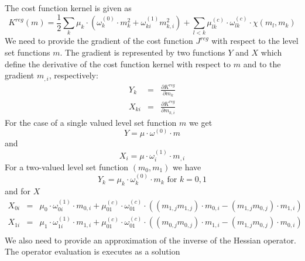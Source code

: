 The cost function kernel is given as
\begin{equation}\label{ref:EQU:REG:100}
K^{reg}(m) = \frac{1}{2}
\sum_{k} \mu_k \cdot ( \omega^{(0)}_k \cdot m_k^2 + \omega^{(1)}_{ki}m_{k,i}^2 ) 
+  \sum_{l<k} \mu^{(c)}_{lk} \cdot \omega^{(c)}_{lk}  \cdot  \chi(m_l,m_k)
\end{equation} 
We need to provide the gradient of the cost function $J^{reg}$  with respect to the level set functions $m$.
The gradient is represented by two functions $Y$ and $X$ which define the 
derivative of the cost function kernel with respect to $m$ and to the gradient $m_{,i}$, respectively:
\begin{equation}\label{ref:EQU:REG:101}
\begin{array}{rcl}
  Y_k & = & \displaystyle{\frac{\partial K^{reg}}{\partial m_k}} \\
   X_{ki} & = & \displaystyle{\frac{\partial K^{reg}}{\partial m_{k,i}}} 
\end{array}
\end{equation} 
For the case of a single valued level set function $m$ we get 
\begin{equation}\label{ref:EQU:REG:202}
Y = \mu \cdot \omega^{(0)} \cdot m
\end{equation} 
and 
\begin{equation}\label{ref:EQU:REG:203}
 X_{i} = \mu \cdot \omega^{(1)}_{i} \cdot m_{,i}
\end{equation}
For a two-valued level set function $(m_0,m_1)$ we have
\begin{equation}\label{ref:EQU:REG:302}
Y_k = \mu_k \cdot \omega^{(0)}_k \cdot m_k \mbox{ for } k=0,1
\end{equation} 
and for $X$ 
\begin{equation}\label{ref:EQU:REG:303}
\begin{array}{rcl}
 X_{0i} &  = & \mu_0 \cdot \omega^{(1)}_{0i} \cdot m_{0,i} + \mu^{(c)}_{01} \cdot \omega^{(c)}_{01} \cdot
\left( (m_{1,j}m_{1,j} ) \cdot m_{0,i} - (m_{1,j}m_{0,j} ) \cdot m_{1,i} \right) \\
 X_{1i} &  = & \mu_1 \cdot \omega^{(1)}_{1i} \cdot m_{1,i} + \mu^{(c)}_{01} \cdot \omega^{(c)}_{01} \cdot
\left( (m_{0,j}m_{0,j} ) \cdot m_{1,i} - (m_{1,j}m_{0,j} ) \cdot m_{0,i} \right)
\\
\end{array}
\end{equation}  
We also need to provide an approximation of the inverse of the Hessian operator. The operator evaluation is executes as a solution 
